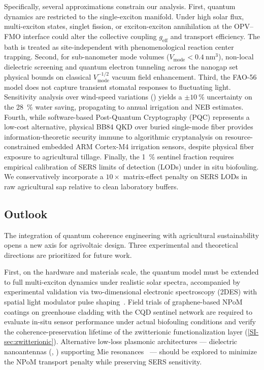\documentclass[12pt]{iopart}
\begin{document}
Specifically, several approximations constrain our analysis.
First, quantum dynamics are restricted to the single-exciton manifold. Under high solar flux, multi-exciton states, singlet fission, or exciton-exciton annihilation at the OPV--FMO interface could alter the collective coupling $g_{\mathrm{eff}}$ and transport efficiency. The bath is treated as site-independent with phenomenological reaction center trapping.
Second, for sub-nanometer mode volumes ($V_{\mathrm{mode}} < \qty{0.4}{\nm\cubed}$), non-local dielectric screening and quantum electron tunneling across the nanogap set physical bounds on classical $V_{\mathrm{mode}}^{-1/2}$ vacuum field enhancement.
Third, the FAO-56 model does not capture transient stomatal responses to fluctuating light. Sensitivity analysis over wind-speed variations () yields a $\pm\qty{10}{\percent}$ uncertainty on the \qty{28}{\percent} water saving, propagating to annual irrigation and NEB estimates.
Fourth, while software-based Post-Quantum Cryptography (PQC) represents a low-cost alternative, physical BB84 QKD over buried single-mode fiber provides information-theoretic security immune to algorithmic cryptanalysis on resource-constrained embedded ARM Cortex-M4 irrigation sensors, despite physical fiber exposure to agricultural tillage.
Finally, the \qty{1}{\percent} sentinel fraction requires empirical calibration of SERS limits of detection (LODs) under in situ biofouling. We conservatively incorporate a $10\times$ matrix-effect penalty on SERS LODs in raw agricultural sap relative to clean laboratory buffers.

\subsection{Outlook}

The integration of quantum coherence engineering with agricultural sustainability opens a new axis for agrivoltaic design. Three experimental and theoretical directions are prioritized for future work.

First, on the hardware and materials scale, the quantum model must be extended to full multi-exciton dynamics under realistic solar spectra, accompanied by experimental validation via two-dimensional electronic spectroscopy (2DES) with spatial light modulator pulse shaping~\cite{Gunthardt2023,Sebastian2024}. Field trials of graphene-based NPoM coatings on greenhouse cladding with the CQD sentinel network are required to evaluate in-situ sensor performance under actual biofouling conditions and verify the coherence-preservation lifetime of the zwitterionic functionalization layer (\cref{SI-sec:zwitterionic}). Alternative low-loss plasmonic architectures --- dielectric nanoantennas (, ) supporting Mie resonances~\cite{Caldarola2015} --- should be explored to minimize the NPoM transport penalty while preserving SERS sensitivity.
\end{document}
